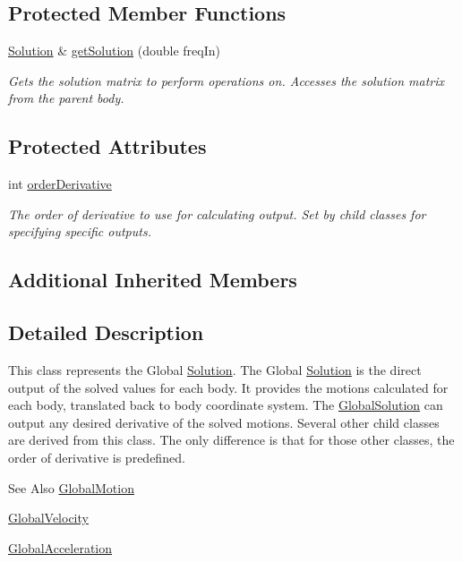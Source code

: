 \subsection*{Protected Member Functions}
\begin{DoxyCompactItemize}
\item 
\hyperlink{classosea_1_1ofreq_1_1_solution}{Solution} \& \hyperlink{classosea_1_1ofreq_1_1_global_solution_a43a8caad9f88e3b468c3e9a364b45500}{get\-Solution} (double freq\-In)
\begin{DoxyCompactList}\small\item\em Gets the solution matrix to perform operations on. Accesses the solution matrix from the parent body. \end{DoxyCompactList}\end{DoxyCompactItemize}
\subsection*{Protected Attributes}
\begin{DoxyCompactItemize}
\item 
int \hyperlink{classosea_1_1ofreq_1_1_global_solution_a935843ad9f4fd2de2a2ec407de45a20d}{order\-Derivative}
\begin{DoxyCompactList}\small\item\em The order of derivative to use for calculating output. Set by child classes for specifying specific outputs. \end{DoxyCompactList}\end{DoxyCompactItemize}
\subsection*{Additional Inherited Members}


\subsection{Detailed Description}
This class represents the Global \hyperlink{classosea_1_1ofreq_1_1_solution}{Solution}. The Global \hyperlink{classosea_1_1ofreq_1_1_solution}{Solution} is the direct output of the solved values for each body. It provides the motions calculated for each body, translated back to body coordinate system. The \hyperlink{classosea_1_1ofreq_1_1_global_solution}{Global\-Solution} can output any desired derivative of the solved motions. Several other child classes are derived from this class. The only difference is that for those other classes, the order of derivative is predefined. \begin{DoxySeeAlso}{See Also}
\hyperlink{classosea_1_1ofreq_1_1_global_motion}{Global\-Motion} 

\hyperlink{classosea_1_1ofreq_1_1_global_velocity}{Global\-Velocity} 

\hyperlink{classosea_1_1ofreq_1_1_global_acceleration}{Global\-Acceleration} 
\end{DoxySeeAlso}


